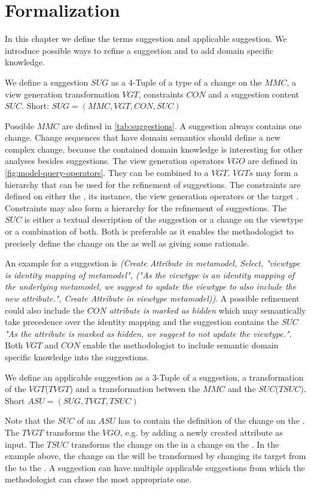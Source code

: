 \section{Formalization}
\label{sec:Formalization}
In this chapter we define the terms suggestion and applicable suggestion. We introduce possible ways to refine a suggestion and to add domain specific knowledge.

\begin{definition}[Suggestion]
We define a suggestion $SUG$ as a 4-Tuple of a type of a change on the \metamodel $MMC$, a view generation transformation $VGT$, constraints $CON$ and a suggestion content $SUC$. Short: $SUG = (MMC, VGT, CON, SUC)$
\end{definition}
Possible $MMC$ are defined in \cref{tab:suggestions}. A suggestion always contains one change. Change sequences that have domain semantics should define a new complex change, because the contained domain knowledge is interesting for other analyses besides suggestions. The view generation operators $VGO$ are defined in \cref{fig:model-query-operators}. They can be combined to a $VGT$. $VGTs$ may form a hierarchy that can be used for the refinement of suggestions. The constraints are defined on either the \metamodel, its instance, the view generation operators or the target \metamodel. Constraints may also form a hierarchy for the refinement of suggestions. The $SUC$ is either a textual description of the suggestion or a change on the viewtype or a combination of both. Both is preferable as it enables the methodologist to precisely define the change on the \viewtype \metamodel as well as giving some rationale.

An example for a suggestion is \textit{(Create Attribute in metamodel, Select,  "viewtype is identity mapping of metamodel", ("As the viewtype is an identity mapping of the underlying metamodel, we suggest to update the viewtype to also include the new attribute.", Create Attribute in viewtype metamodel))}. A possible refinement could also include the $CON$ \textit{attribute is marked as hidden} which may semantically take precedence over the identity mapping and the suggestion contains the $SUC$ \textit{"As the attribute is marked as hidden, we suggest to not update the viewtype."}. Both $VGT$ and $CON$ enable the methodologist to include semantic domain specific knowledge into the suggestions.

\begin{definition}
We define an applicable suggestion as a 3-Tuple of a suggestion, a transformation of the $VGT$($TVGT$) and a transformation between the $MMC$ and the $SUC$($TSUC$). Short $ASU = (SUG, TVGT, TSUC)$
\end{definition}
Note that the $SUC$ of an $ASU$ has to contain the definition of the change on the \viewtype \metamodel. The $TVGT$ transforms the $VGO$, e.g. by adding a newly created attribute as input. The $TSUC$ transforms the change on the \metamodel in a change on the \viewtype \metamodel. In the example above, the change on the \metamodel will be transformed by changing its target from the \metamodel to the \viewtype \metamodel. A suggestion can have multiple applicable suggestions from which the methodologist can chose the most appropriate one.